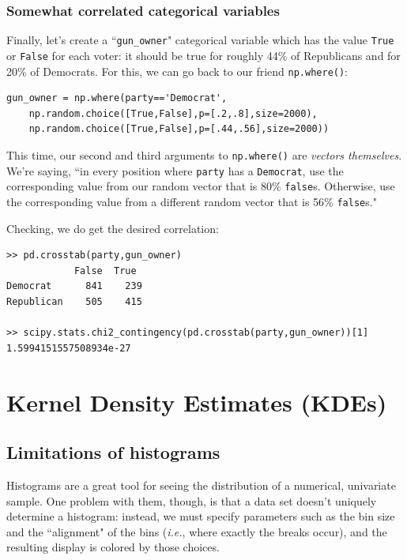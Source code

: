 \documentclass[12pt]{article}
\begin{document}
\subsubsection{Somewhat correlated categorical variables}

Finally, let's create a ``\texttt{gun\_owner}" categorical variable which has
the value \texttt{True} or \texttt{False} for each voter: it should be true
for roughly 44\% of Republicans and for 20\% of Democrats. For this, we can go
back to our friend \texttt{np.where()}:

\begin{Verbatim}[fontsize=\footnotesize,samepage=true]
gun_owner = np.where(party=='Democrat',
    np.random.choice([True,False],p=[.2,.8],size=2000),
    np.random.choice([True,False],p=[.44,.56],size=2000))
\end{Verbatim}

This time, our second and third arguments to \texttt{np.where()} are
\textit{vectors themselves}. We're saying, ``in every position where
\texttt{party} has a \texttt{\textquotesingle Democrat\textquotesingle }, use the corresponding value from our
random vector that is 80\% \texttt{false}s. Otherwise, use the corresponding
value from a different random vector that is 56\% \texttt{false}s."

Checking, we do get the desired correlation:

\begin{Verbatim}[fontsize=\footnotesize,samepage=true]
>> pd.crosstab(party,gun_owner)
            False  True 
Democrat      841    239
Republican    505    415

>> scipy.stats.chi2_contingency(pd.crosstab(party,gun_owner))[1]
1.5994151557508934e-27
\end{Verbatim}

\section{Kernel Density Estimates (KDEs)}

\subsection{Limitations of histograms}

Histograms are a great tool for seeing the distribution of a numerical,
univariate sample. One problem with them, though, is that a data set doesn't
uniquely determine a histogram: instead, we must specify parameters such as
the bin size and the ``alignment" of the bins (\textit{i.e.}, where exactly
the breaks occur), and the resulting display is colored by those choices.
\end{document}
